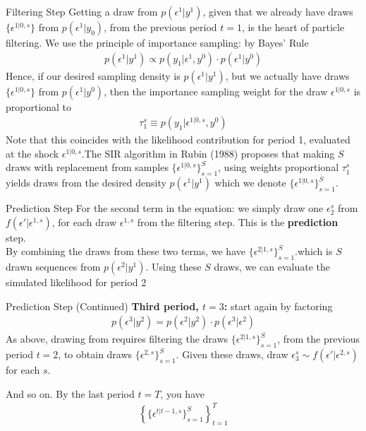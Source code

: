 \begin{frame}{Filtering Step}
Getting a draw from $p(\epsilon^1| y^1)$, given that we already have draws $\{\epsilon^{1|0,s} \}$ from $p(\epsilon^1 | y_0)$, from the previous period $t = 1$, is the heart of particle filtering. We use the principle of importance sampling: by Bayes' Rule
\begin{eqnarray*}
p(\epsilon^1 | y^1) \propto p(y_1 | \epsilon^1, y^0) \cdot p (\epsilon^1 | y^0)
\end{eqnarray*}
Hence, if our desired sampling density is $p(\epsilon^1 | y^1)$, but we actually have draws $\{ \epsilon^{1|0,s}\}$ from $p(\epsilon^1| y^0)$, then the importance sampling weight for the draw
 $\epsilon^{1|0,s}$ is proportional to
\begin{eqnarray*}
\tau_1^s \equiv p(y_1 | \epsilon^{1|0,s},y^0)
\end{eqnarray*}
Note that this coincides with the likelihood contribution for period 1, evaluated at the shock $\epsilon^{1|0,s}$.The SIR algorithm in Rubin (1988) proposes that making $S$ draws with replacement from samples $\{ \epsilon^{1|0,s}\}_{s=1}^S$, using weights proportional $\tau_1^s$ yields draws from the desired density $p(\epsilon^1 | y^1)$ which we denote $\{ \epsilon^{1|0,s}\}_{s=1}^S$.
\end{frame}

\begin{frame}{Prediction Step}
For the second term in the equation: we simply draw one $\epsilon_2^s$ from $f(\epsilon' | \epsilon^{1,s})$, for each draw $\epsilon^{1,s}$ from the filtering step. This is the \textbf{prediction} step.\\
\vspace{0.25cm}
By combining the draws from these two terms, we have $\{ \epsilon^{2|1,s}\}_{s=1}^S$.which is $S$ drawn sequences from $p(\epsilon^2 | y^1)$. Using these $S$ draws, we can evaluate the simulated likelihood for period 2
\end{frame}

\begin{frame}{Prediction Step (Continued)}
\textbf{Third period, $t = 3$:} start again by factoring
\begin{align*}
p(\epsilon^3 | y^2) = p(\epsilon^2 | y^2) \cdot p(\epsilon^3 | \epsilon^2)
\end{align*}
As above, drawing from  requires filtering the draws $\{ \epsilon^{2|1,s}\}_{s=1}^S$, from the previous period $t = 2$, to obtain draws $\{ \epsilon^{2,s}\}_{s=1}^S$. Given these draws, draw $\epsilon_3^s \sim f(\epsilon' | \epsilon^{2,s})$ for each $s$.

And so on. By the last period $t = T$, you have
\begin{align*}
\left\{ \{ \epsilon^{t|t-1,s}\}_{s=1}^S \right\}_{t=1}^T
\end{align*}
\end{frame}

